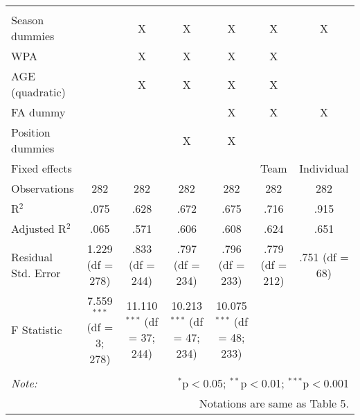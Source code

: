 \begin{table}[H]
\begin{tabular}{@{\extracolsep{5pt}}lcccccc}
  & & & & & & \\
\hline \\[-1.8ex]
Season dummies &  & X & X & X & X & X \\
WPA &  & X & X & X & X &  \\
AGE (quadratic) &  & X & X & X & X &  \\
FA dummy &  &  &  & X & X & X \\
Position dummies &  &  & X & X &  &  \\
Fixed effects &  &  &  &  & Team & Individual \\
Observations & 282 & 282 & 282 & 282 & 282 & 282 \\
R$^{2}$ & .075 & .628 & .672 & .675 & .716 & .915 \\
Adjusted R$^{2}$ & .065 & .571 & .606 & .608 & .624 & .651 \\
Residual Std. Error & 1.229 (df = 278) & .833 (df = 244) & .797 (df = 234) & .796 (df = 233) & .779 (df = 212) & .751 (df = 68) \\
F Statistic & 7.559$^{***}$ (df = 3; 278) & 11.110$^{***}$ (df = 37; 244) & 10.213$^{***}$ (df = 47; 234) & 10.075$^{***}$ (df = 48; 233) &  &  \\
\hline
\hline \\[-1.8ex]
\textit{Note:}  & \multicolumn{6}{r}{$^{*}$p$<$0.05; $^{**}$p$<$0.01; $^{***}$p$<$0.001} \\
& \multicolumn{6}{r}{Notations are same as Table 5.} \\
\end{tabular}
\end{table}
